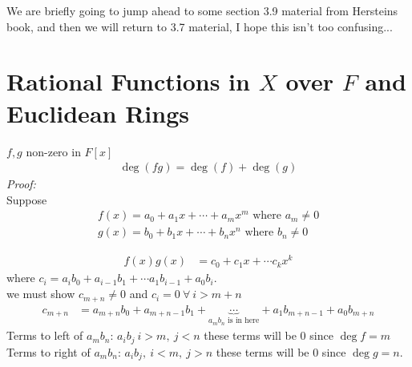 \setcounter{section}{8}
\begin{tcolorbox}
    We are briefly going to jump ahead to some section 3.9 material from Hersteins book, and then we will return to 3.7 material, I hope this isn't too confusing...
\end{tcolorbox}
\section{Rational Functions in $X$ over $F$ and Euclidean Rings}
\begin{lemma}
    $f,g$ non-zero in $F[x]$
    \begin{align}
        \deg(fg)= \deg(f)+\deg(g) \nonumber
    \end{align}
    \textit{Proof:} \\
    \noindent Suppose 
    \begin{align}
        f(x)= a_0 +a_1x+\cdots + a_mx^m \text{ where } a_m \neq 0 \nonumber \\
        g(x)= b_0 +b_1x + \cdots + b_nx^n \text{ where } b_n\neq 0 \nonumber
    \end{align}

    \begin{align}
        f(x)g(x) &= c_0 + c_1x + \cdots c_kx^k \nonumber
    \end{align}
    where $c_i = a_ib_0 + a_{i-1}b_1 + \cdots a_1b_{i-1} + a_0 b_i$. \\
    \noindent we must show $c_{m+n}\neq 0$ and $c_i = 0 \ \forall \ i >m+n$
    \begin{align}
        c_{m+n} &= a_{m+n} b_0 + a_{m+n-1}b_1 + \underbrace{\cdots}_{a_mb_n \text{ is in here}}+ a_1b_{m+n-1}+a_0b_{m+n} \nonumber
    \end{align}
    Terms to left of $a_mb_n$: $a_ib_j \ i>m, \ j <n$ these terms will be $0$ since $\deg f = m$ \\
    \noindent Terms to right of $a_mb_n$: $a_ib_j, \ i<m, \ j>n$ these terms will be $0$ since $\deg g = n$. \\


\end{lemma}
